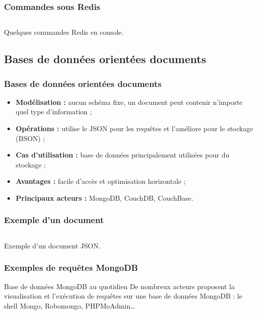 	\begin{frame}
		\frametitle{Commandes sous Redis}

		\begin{listing}[H]
			\inputminted[fontsize=\tiny, linenos=true]{text}{code/commandesRedis.txt}
			\caption{Quelques commandes Redis en console.}
		\end{listing}
	\end{frame}

	\subsection{Bases de données orientées documents}
	\begin{frame}
		\frametitle{Bases de données orientées documents}

		\begin{itemize}
			\item \textbf{Modélisation :} aucun schéma fixe, un document peut contenir n'importe quel type d'information ;
			\item \textbf{Opérations :} utilise le JSON pour les requêtes et l'améliore pour le stockage (BSON) ;
			\item \textbf{Cas d'utilisation :} base de données principalement utilisées pour du stockage ;
			\item \textbf{Avantages :} facile d'accès et optimisation horizontale ;
			\item \textbf{Principaux acteurs :} MongoDB, CouchDB, CouchBase.
		\end{itemize}
	\end{frame}

	\begin{frame}
		\frametitle{Exemple d'un document}

		\begin{listing}[H]
			\inputminted[fontsize=\tiny, linenos=true]{json}{code/exemple-document.json}
			\caption{Exemple d'un document JSON.}
		\end{listing}
	\end{frame}

	\begin{frame}
		\frametitle{Exemples de requêtes MongoDB}


		\begin{exampleblock}{Base de données MongoDB au quotidien}
			De nombreux acteurs proposent la visualisation et l'exécution de requêtes sur une base de données MongoDB : le shell Mongo, Robomongo, PHPMoAdmin\dots
		\end{exampleblock}

	\end{frame}
